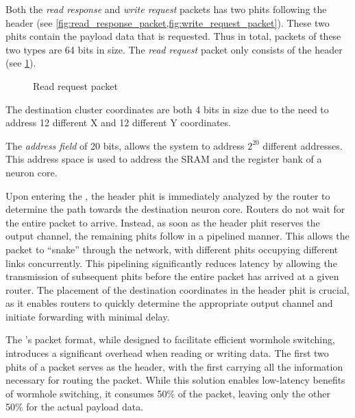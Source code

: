 Both the \textit{read response} and \textit{write request} packets has two phits following the header (see \cref{fig:read_response_packet,fig:write_request_packet}).
These two phits contain the payload data that is requested.
Thus in total, packets of these two types are 64 bits in size.
The \textit{read request} packet only consists of the header (see \cref{fig:read_request_packet}).

\hspace*{0.5em}
\begin{figure}[hbtp]
    \centering
    \begin{adjustbox}{width=0.7\linewidth}
        
    \end{adjustbox}
    \caption{Read request packet}
    \label{fig:read_request_packet}
\end{figure}

The destination cluster coordinates are both 4 bits in size due to the need to address 12 different X and 12 different Y coordinates.

The \textit{address field} of 20 bits, allows the system to address $2^{20}$ different addresses.
This address space is used to address the SRAM and the register bank of a neuron core.

Upon entering the \confignoc{}, the header phit is immediately analyzed by the router to determine the path towards the destination neuron core.
Routers do not wait for the entire packet to arrive.
Instead, as soon as the header phit reserves the output channel, the remaining phits follow in a pipelined manner.
This allows the packet to ``snake'' through the network, with different phits occupying different links concurrently.
This pipelining significantly reduces latency by allowing the transmission of subsequent phits before the entire packet has arrived at a given router.
The placement of the destination coordinates in the header phit is crucial, as it enables routers to quickly determine the appropriate output channel and initiate forwarding with minimal delay.


The \confignoc{}'s packet format, while designed to facilitate efficient wormhole switching, introduces a significant overhead when reading or writing data.
The first two phits of a packet serves as the header, with the first carrying all the information necessary for routing the packet.
While this solution enables low-latency benefits of wormhole switching, it consumes 50\% of the packet, leaving only the other 50\% for the actual payload data.

